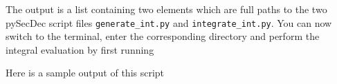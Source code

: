 \documentclass[../FeynHelpersManual.tex]{subfiles}
\begin{document}
\begin{Shaded}
\begin{Highlighting}[]
\ExtensionTok{=}\OperatorTok{[}\OperatorTok{,} \OperatorTok{\{}\OperatorTok{,} \OperatorTok{\}]}
\ExtensionTok{=}\OperatorTok{[}\OperatorTok{,} \OperatorTok{\{}\OperatorTok{[\{}\OperatorTok{,}\OperatorTok{\}],}\OperatorTok{[\{}\SpecialCharTok{+} \OperatorTok{,}\OperatorTok{\}]\},} \OperatorTok{\{}\OperatorTok{\},} \OperatorTok{\{}\OperatorTok{\},} \OperatorTok{\{}\OperatorTok{[}\OperatorTok{][}\OperatorTok{]} \OtherTok{{-}\textgreater{}}\OperatorTok{\},} \OperatorTok{\{\}]}
\ExtensionTok{=}\OperatorTok{[}\OperatorTok{,}\OperatorTok{,} \OperatorTok{[],} 
\OtherTok{{-}\textgreater{}} \OperatorTok{\{}\OtherTok{{-}\textgreater{}} \OperatorTok{,}\OtherTok{{-}\textgreater{}} \OperatorTok{,}\OtherTok{{-}\textgreater{}} \OperatorTok{\},}\OtherTok{{-}\textgreater{}} \OperatorTok{]}
\end{Highlighting}
\end{Shaded}

The output is a list containing two elements which are full paths to the
two pySecDec script files \texttt{generate_int.py} and
\texttt{integrate_int.py}. You can now switch to the terminal, enter the
corresponding directory and perform the integral evaluation by first
running

\begin{Shaded}
\begin{Highlighting}[]
\end{Highlighting}
\end{Shaded}

Here is a sample output of this script
\end{document}
